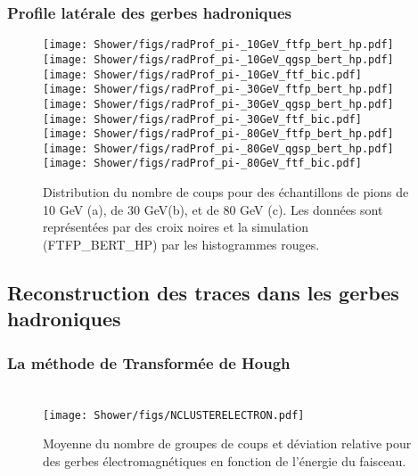 \subsection{Profile latérale des gerbes hadroniques}
\label{sec.lateralProfile}
\begin{figure}[!ht]
  \texttt{[image: Shower/figs/radProf\_pi-\_10GeV\_ftfp\_bert\_hp.pdf]}
  \texttt{[image: Shower/figs/radProf\_pi-\_10GeV\_qgsp\_bert\_hp.pdf]}
  \texttt{[image: Shower/figs/radProf\_pi-\_10GeV\_ftf\_bic.pdf]}  \\
  \texttt{[image: Shower/figs/radProf\_pi-\_30GeV\_ftfp\_bert\_hp.pdf]}
  \texttt{[image: Shower/figs/radProf\_pi-\_30GeV\_qgsp\_bert\_hp.pdf]}
  \texttt{[image: Shower/figs/radProf\_pi-\_30GeV\_ftf\_bic.pdf]}  \\
  \texttt{[image: Shower/figs/radProf\_pi-\_80GeV\_ftfp\_bert\_hp.pdf]}
  \texttt{[image: Shower/figs/radProf\_pi-\_80GeV\_qgsp\_bert\_hp.pdf]}
  \texttt{[image: Shower/figs/radProf\_pi-\_80GeV\_ftf\_bic.pdf]}
  \caption{Distribution du nombre de coups pour des échantillons de pions de 10 GeV (a), de 30 GeV(b), et de 80 GeV (c). Les données sont représentées par des croix noires et la simulation (FTFP\_BERT\_HP) par les histogrammes rouges. \label{fig.pi-nhit}}
\end{figure}


\section{Reconstruction des traces dans les gerbes hadroniques}
\label{sec.hough}
\subsection{La méthode de Transformée de Hough}


\appendix

\chapter{}
\label{app.cluster}
\begin{figure}[!ht]
  \centering
  \texttt{[image: Shower/figs/NCLUSTERELECTRON.pdf]}
  \caption{Moyenne du nombre de groupes de coups et déviation relative pour des gerbes électromagnétiques en fonction de l'énergie du faisceau.}
  \label{fig.nhit_e-_ebeam}
\end{figure}
